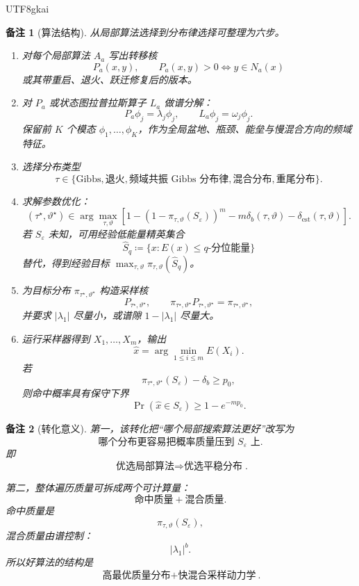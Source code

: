 \documentclass[12pt]{article}
\newtheorem{remark}{备注}[section]
\newcommand{\DefEq}{\coloneqq}
\begin{document}
\begin{CJK*}{UTF8}{gkai}
\begin{remark}[算法结构]
从局部算法选择到分布律选择可整理为六步。
\begin{enumerate}
  \item 对每个局部算法 \(A_a\) 写出转移核
  \[
    P_a(x,y),
    \qquad
    P_a(x,y)>0\Longleftrightarrow y\in N_a(x)
  \]
  或其带重启、退火、跃迁修复后的版本。
  \item 对 \(P_a\) 或状态图拉普拉斯算子 \(L_a\) 做谱分解：
  \[
    P_a\phi_j=\lambda_j\phi_j,
    \qquad
    L_a\phi_j=\omega_j\phi_j.
  \]
  保留前 \(K\) 个模态 \(\phi_1,\ldots,\phi_K\)，作为全局盆地、瓶颈、能垒与慢混合方向的频域特征。
  \item 选择分布类型
  \[
    \tau\in
    \{\text{Gibbs},\text{退火},\text{频域共振 Gibbs 分布律},\text{混合分布},\text{重尾分布}\}.
  \]
  \item 求解参数优化：
  \[
    (\tau^\star,\vartheta^\star)
    \in
    \arg\max_{\tau,\vartheta}
    \left[
    1-\left(1-\pi_{\tau,\vartheta}(S_\varepsilon)\right)^m
    -m\delta_b(\tau,\vartheta)
    -\delta_{\mathrm{est}}(\tau,\vartheta)
    \right].
  \]
  若 \(S_\varepsilon\) 未知，可用经验低能量精英集合
  \[
    \widehat S_q
    \DefEq
    \{x:E(x)\le q\text{-分位能量}\}
  \]
  替代，得到经验目标 \(\max_{\tau,\vartheta}\pi_{\tau,\vartheta}(\widehat S_q)\)。
  \item 为目标分布 \(\pi_{\tau^\star,\vartheta^\star}\) 构造采样核
  \[
    P_{\tau^\star,\vartheta^\star},
    \qquad
    \pi_{\tau^\star,\vartheta^\star}P_{\tau^\star,\vartheta^\star}
    =
    \pi_{\tau^\star,\vartheta^\star},
  \]
  并要求 \(|\lambda_1|\) 尽量小，或谱隙 \(1-|\lambda_1|\) 尽量大。
  \item 运行采样器得到 \(X_1,\ldots,X_m\)，输出
  \[
    \hat x=\arg\min_{1\le i\le m}E(X_i).
  \]
  若
  \[
    \pi_{\tau^\star,\vartheta^\star}(S_\varepsilon)-\delta_b\ge p_0,
  \]
  则命中概率具有保守下界
  \[
    \Pr(\hat x\in S_\varepsilon)\ge1-e^{-mp_0}.
  \]
\end{enumerate}
\end{remark}

\begin{remark}[转化意义]
第一，该转化把“哪个局部搜索算法更好”改写为
\[
  \text{哪个分布更容易把概率质量压到 }S_\varepsilon\text{ 上}.
\]
即
\[
  \boxed{
  \text{优选局部算法}
  \Longrightarrow
  \text{优选平稳分布}
  }.
\]

第二，整体遍历质量可拆成两个可计算量：
\[
  \text{命中质量}+\text{混合质量}.
\]
命中质量是
\[
  \pi_{\tau,\vartheta}(S_\varepsilon),
\]
混合质量由谱控制：
\[
  |\lambda_1|^b.
\]
所以好算法的结构是
\[
  \boxed{
  \text{高最优质量分布}
  +
  \text{快混合采样动力学}
  }.
\]


\end{remark}
\end{CJK*}
\end{document}

